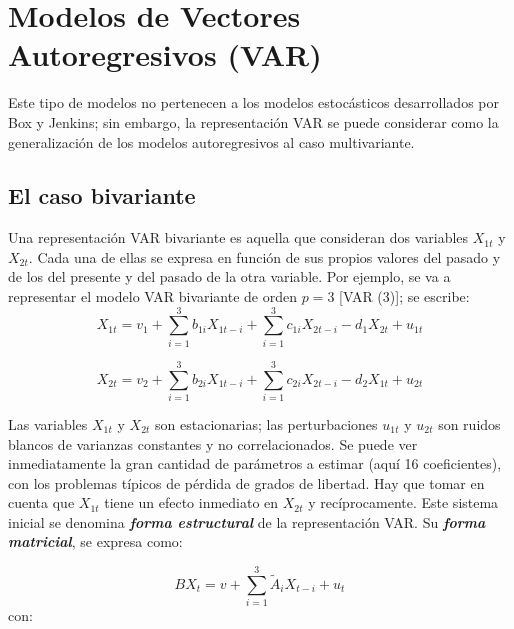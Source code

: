 \section{Modelos de Vectores Autoregresivos (VAR)}
\label{subsec:modelos}

Este tipo de modelos no pertenecen a los modelos estoc\'{a}sticos desarrollados por Box y Jenkins; sin embargo, la representaci\'{o}n VAR se puede considerar como la generalizaci\'{o}n de los modelos autoregresivos al caso multivariante.

\subsection{El caso bivariante}
\label{subsubsec:mylabel4}

Una representaci\'{o}n VAR bivariante es aquella que consideran dos variables $X_{1t}$ y $X_{2t}$. Cada una de ellas se expresa en funci\'{o}n de sus propios valores del pasado y de los del presente y del pasado de la otra variable. Por ejemplo, se va a representar el modelo VAR bivariante de orden $p=3$ [VAR (3)]; se escribe:
\[
X_{1t}=v_{1}+\sum_{i=1}^3 {b_{1i}X_{1t-i}} +\sum_{i=1}^3 {c_{1i}X_{2t-i}} - d_{1}X_{2t}+u_{1t}
\]

\[
X_{2t}=v_{2}+\sum_{i=1}^3 {b_{2i}X_{1t-i}} +\sum_{i=1}^3 {c_{2i}X_{2t-i}} - d_{2}X_{1t}+u_{2t}
\]

Las variables $X_{1t}$ y $X_{2t}$ son estacionarias; las perturbaciones $u_{1t}$ y $u_{2t}$ son ruidos blancos de varianzas 
constantes y no correlacionados. Se puede ver inmediatamente la gran cantidad de par\'{a}metros a estimar (aqu\'{i} 16 coeficientes), con los problemas t\'{i}picos de p\'{e}rdida de grados de libertad. Hay que tomar en cuenta que $X_{1t}$ tiene un efecto inmediato en $X_{2t}$ y rec\'{i}procamente. Este sistema inicial se denomina \textbf{\textit{forma estructural}} de la representaci\'{o}n VAR. Su \textbf{\textit{forma matricial}},  se expresa como:

\[
BX_{t} = v+\sum_{i=1}^3 {\tilde{A}_{i}X_{t-i} + u_{t}} 
\]
con:

